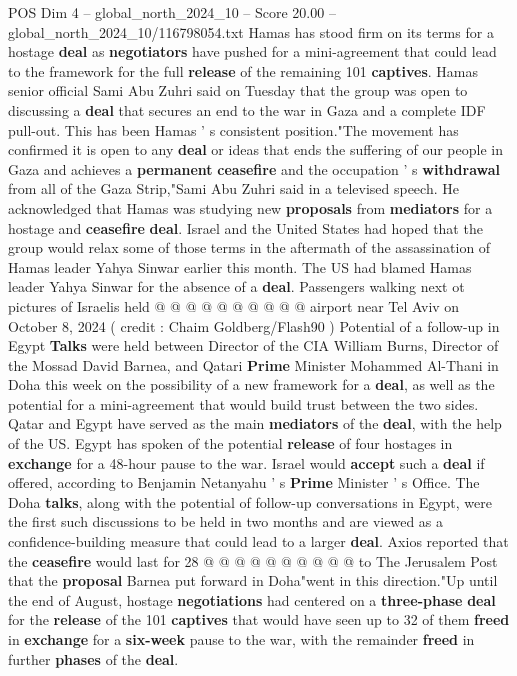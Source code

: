 \begin{textsample}{POS Dim 4 – global\_north\_2024\_10 – Score 20.00 – global\_north\_2024\_10/116798054.txt}  \label{ex:f4_pos_403}
Hamas has stood firm on its terms for a hostage \textbf{deal} as \textbf{negotiators} have pushed for a mini-agreement that could lead to the framework for the full \textbf{release} of the remaining 101 \textbf{captives}.
Hamas senior official Sami Abu Zuhri said on Tuesday that the group was open to discussing a \textbf{deal} that secures an end to the war in Gaza and a complete IDF pull-out.
This has been Hamas ' s consistent position."The movement has confirmed it is open to any \textbf{deal} or ideas that ends the suffering of our people in Gaza and achieves a \textbf{permanent} \textbf{ceasefire} and the occupation ' s \textbf{withdrawal} from all of the Gaza Strip,"Sami Abu Zuhri said in a televised speech.
He acknowledged that Hamas was studying new \textbf{proposals} from \textbf{mediators} for a hostage and \textbf{ceasefire} \textbf{deal}.
Israel and the United States had hoped that the group would relax some of those terms in the aftermath of the assassination of Hamas leader Yahya Sinwar earlier this month.
The US had blamed Hamas leader Yahya Sinwar for the absence of a \textbf{deal}.
Passengers walking next ot pictures of Israelis held @ @ @ @ @ @ @ @ @ @ airport near Tel Aviv on October 8, 2024 ( credit : Chaim Goldberg/Flash90 ) Potential of a follow-up in Egypt \textbf{Talks} were held between Director of the CIA William Burns, Director of the Mossad David Barnea, and Qatari \textbf{Prime} Minister Mohammed Al-Thani in Doha this week on the possibility of a new framework for a \textbf{deal}, as well as the potential for a mini-agreement that would build trust between the two sides.
Qatar and Egypt have served as the main \textbf{mediators} of the \textbf{deal}, with the help of the US.
Egypt has spoken of the potential \textbf{release} of four hostages in \textbf{exchange} for a 48-hour pause to the war.
Israel would \textbf{accept} such a \textbf{deal} if offered, according to Benjamin Netanyahu ' s \textbf{Prime} Minister ' s Office.
The Doha \textbf{talks}, along with the potential of follow-up conversations in Egypt, were the first such discussions to be held in two months and are viewed as a confidence-building measure that could lead to a larger \textbf{deal}.
Axios reported that the \textbf{ceasefire} would last for 28 @ @ @ @ @ @ @ @ @ @ to The Jerusalem Post that the \textbf{proposal} Barnea put forward in Doha"went in this direction."Up until the end of August, hostage \textbf{negotiations} had centered on a \textbf{three-phase} \textbf{deal} for the \textbf{release} of the 101 \textbf{captives} that would have seen up to 32 of them \textbf{freed} in \textbf{exchange} for a \textbf{six-week} pause to the war, with the remainder \textbf{freed} in further \textbf{phases} of the \textbf{deal}.

\end{textsample}
